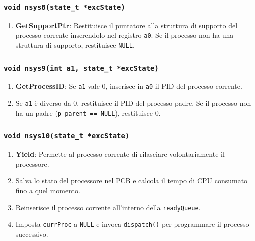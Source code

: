 \documentclass[a4paper,12pt]{article}
\begin{document}
\subsubsection{\texttt{void nsys8(state\_t *excState)}}
\begin{enumerate}
    \item \textbf{GetSupportPtr}: Restituisce il puntatore alla struttura di supporto del processo corrente inserendolo nel registro \texttt{a0}. Se il processo non ha una struttura di supporto, restituisce \texttt{NULL}.
\end{enumerate}

\subsubsection{\texttt{void nsys9(int a1, state\_t *excState)}}
\begin{enumerate}
    \item \textbf{GetProcessID}: Se \texttt{a1} vale 0, inserisce in \texttt{a0} il PID del processo corrente.
    \item Se \texttt{a1} è diverso da 0, restituisce il PID del processo padre. Se il processo non ha un padre (\texttt{p\_parent == NULL}), restituisce 0.
\end{enumerate}

\subsubsection{\texttt{void nsys10(state\_t *excState)}}
\begin{enumerate}
    \item \textbf{Yield}: Permette al processo corrente di rilasciare volontariamente il processore.
    \item Salva lo stato del processore nel PCB e calcola il tempo di CPU consumato fino a quel momento.
    \item Reinserisce il processo corrente all'interno della \texttt{readyQueue}.
    \item Imposta \texttt{currProc} a \texttt{NULL} e invoca \texttt{dispatch()} per programmare il processo successivo.
\end{enumerate}
\end{document}
